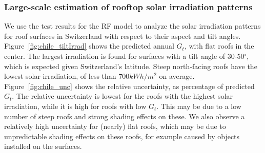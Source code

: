 \subsubsection{Large-scale estimation of rooftop solar irradiation patterns}

We use the test results for the RF model to analyze the solar irradiation patterns for roof surfaces in Switzerland with respect to their aspect and tilt angles. Figure~\ref{fig:chile_tiltIrrad} shows the predicted annual $G_t$, with flat roofs in the center. The largest irradiation is found for surfaces with a tilt angle of 30-50$^\circ$, which is expected given Switzerland’s latitude. Steep north-facing roofs have the lowest solar irradiation, of less than $700 kWh/m^2$ on average. Figure~\ref{fig:chile_unc} shows the relative uncertainty, as percentage of predicted $G_t$. The relative uncertainty is lowest for the roofs with the highest solar irradiation, while it is high for roofs with low $G_t$. This may be due to a low number of steep roofs and strong shading effects on these. We also observe a relatively high uncertainty for (nearly) flat roofs, which may be due to unpredictable shading effects on these roofs, for example caused by objects installed on the surfaces.

